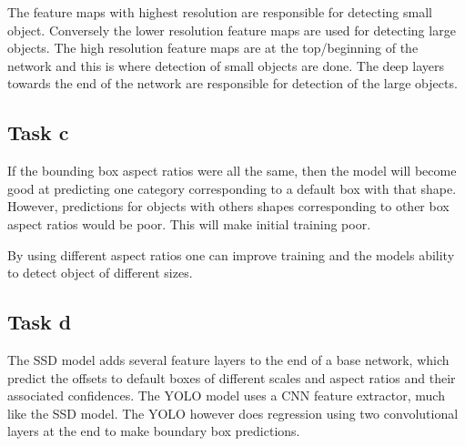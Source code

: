 \documentclass{article}
\begin{document}
The feature maps with highest resolution are responsible for detecting small object. Conversely the lower resolution feature maps are used for detecting large objects. The high resolution feature maps are at the top/beginning of the network and this is where detection of small objects are done. The deep layers towards the end of the network are responsible for detection of the large objects.

\subsection{Task c}


If the bounding box aspect ratios were all the same, then the model will become good at predicting one category corresponding to a default box with that shape. However, predictions for objects with others shapes corresponding to other box aspect ratios would be poor. This will make initial training poor. 

By using different aspect ratios one can improve training and the models ability to detect object of different sizes.



\subsection{Task d}

The SSD model adds several feature layers to the end of a base network, which predict the offsets to default boxes of different scales and aspect ratios and their associated confidences. The YOLO model uses a CNN feature extractor, much like the SSD model. The YOLO however does regression using two convolutional layers at the end to make boundary box predictions. 

\end{document}
